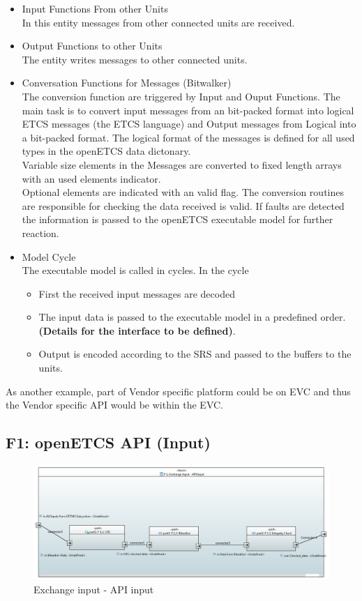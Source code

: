 \documentclass{template/openetcs_report}
\begin{document}
\begin{itemize}
\item Input Functions From other Units\\
In this entity messages from other connected units are received.
\item Output Functions to other Units\\
The entity writes messages to other connected units.
\item Conversation Functions for Messages (Bitwalker)\\
The conversion function are triggered by Input and Ouput Functions. The main task is to convert input messages from an bit-packed format into logical ETCS messages (the ETCS language) and Output messages from Logical into a bit-packed format. The logical format of the messages is defined for all used types in the openETCS data dictonary. \\
Variable size elements in the Messages are converted to fixed length arrays with an used elements indicator.\\
Optional elements are indicated with an valid flag.
The conversion routines are responsible for checking the data received is valid. If  faults are detected the information is passed to the openETCS executable model for further reaction. 
\item Model Cycle\\
The executable model is called in cycles. In the cycle 
\begin{itemize}
\item First the received input messages are decoded
\item The input data is passed to the executable model in a predefined order. \textbf{(Details for the interface to be defined)}.
\item Output is encoded according to the SRS and passed to the  buffers to the units.
\end{itemize}

\end{itemize}

As another example, part of Vendor specific platform could be on EVC
and thus the Vendor specific API would be within the EVC.

\newpage
\subsection{F1: openETCS API (Input)}
\begin{figure}[hbtp]
\centering
\includegraphics [scale=0.5] {images/F1_Exchange_input}
\caption{Exchange input - API input}
\end{figure}
\end{document}
